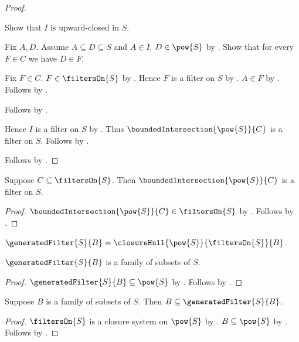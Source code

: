 \begin{proof}
\begin{subproof}
        Show that $I$ is upward-closed in $S$.
        \begin{subproof}
            Fix $A,D$.
            Assume $A\subseteq D\subseteq S$ and $A\in I$.
            $D\in\pow{S}$ by .
            Show that for every $F\in C$ we have $D\in F$.
            \begin{subproof}
                Fix $F\in C$.
                $F\in\filtersOn{S}$ by .
                Hence $F$ is a filter on $S$ by
                    .
                $A\in F$ by .
                Follows by .
            \end{subproof}
            Follows by .
        \end{subproof}
        Hence $I$ is a filter on $S$ by .
        Thus $\boundedIntersection{\pow{S}}{C}$ is a filter on $S$.
        Follows by .
    \end{subproof}
    Follows by .
\end{proof}

\begin{proposition}\label{bounded_intersection_of_filters_is_filter}
    Suppose $C\subseteq\filtersOn{S}$.
    Then $\boundedIntersection{\pow{S}}{C}$ is a filter on $S$.
\end{proposition}
\begin{proof}
    $\boundedIntersection{\pow{S}}{C}\in\filtersOn{S}$ by
        .
    Follows by .
\end{proof}

\begin{definition}\label{generated_filter}
    $\generatedFilter{S}{B}
        =\closureHull{\pow{S}}{\filtersOn{S}}{B}$.
\end{definition}

\begin{proposition}\label{generated_filter_type}
    $\generatedFilter{S}{B}$ is a family of subsets of $S$.
\end{proposition}
\begin{proof}
    $\generatedFilter{S}{B}\subseteq\pow{S}$ by
        .
    Follows by .
\end{proof}

\begin{proposition}\label{generated_filter_contains}
    Suppose $B$ is a family of subsets of $S$.
    Then $B\subseteq\generatedFilter{S}{B}$.
\end{proposition}
\begin{proof}
    $\filtersOn{S}$ is a closure system on $\pow{S}$ by
        .
    $B\subseteq\pow{S}$ by .
    Follows by .
\end{proof}

